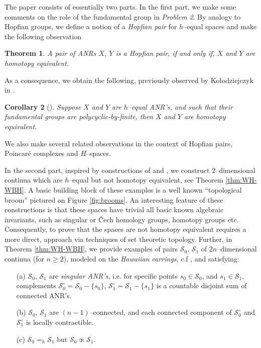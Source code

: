 \documentclass[reqno,12pt]{amsart}
\newtheorem{theorem}{Theorem}
\newtheorem{corollary}[theorem]{Corollary}
\theoremstyle{ourremark}
\numberwithin{equation}{section}
\numberwithin{theorem}{section}
\begin{document}
The paper consists of essentially two parts. In the first part, we make some comments on the role of the fundamental group in {\em Problem 2}. By analogy to Hopfian groups, we define a notion of a {\em Hopfian pair} for $h$--equal spaces and make the following observation
\begin{theorem}\label{thm:hopfian}
A pair of ANRs $X$, $Y$ is a Hopfian pair, if and only if, $X$ and $Y$ are homotopy equivalent.
\end{theorem}
{\noindent} As a consequence, we obtain the following, previously observed by Ko{\l}odziejczyk in \cite{Kolodziejczyk05}. 
\begin{corollary}[\cite{Kolodziejczyk05}]\label{cor:polycyclic}
 Suppose $X$ and $Y$  are $h$--equal ANR's, and such that their fundamental groups are polycyclic-by-finite, then $X$ and $Y$ are  homotopy equivalent.
\end{corollary}
We also make several related observations in the context of Hopfian pairs, Poincar\'e complexes and $H$--spaces.

In the second part, inspired by constructions of \cite{Karimov-Repovs-Rosicki-Zastrow05} and \cite{Stewart58}, we construct  $2$--dimensional continua which are $h$--equal but not homotopy equivalent, see Theorem \ref{thm:WH-WBH}. A basic building block of these examples is a well known ``topological broom'' pictured on Figure \ref{fig:brooms}.
An interesting feature of these constructions is that these spaces have trivial all basic known algebraic invariants, such as singular or \v{C}ech homology groups, homotopy groups etc. Consequently, to prove that the spaces are not homotopy equivalent  requires a more direct, approach via techniques of set theoretic topology. 
Further, in Theorem \ref{thm:WH-WBH},  we provide examples of pairs $\mathcal{S}_0$, $\mathcal{S}_1$ of $2n$--dimensional continua (for $n\geq 2$), modeled on the {\em Hawaiian earrings}, c.f \cite{Eda-Kawamura00},  and  satisfying:    
\begin{itemize}
\item[(a)] $\mathcal{S}_0$, $\mathcal{S}_1$ are {\em singular ANR's}, i.e. for specific points $s_0\in \mathcal{S}_0$, and $s_1\in \mathcal{S}_1$, complements $\mathcal{S}^\circ_0=\mathcal{S}_0-\{s_0\}$, $\mathcal{S}^\circ_1=\mathcal{S}_1-\{s_1\}$ is a countable disjoint sum of connected ANR's.
\item[(b)] $\mathcal{S}_0$, $\mathcal{S}_1$ are $(n-1)$--connected, and each connected component of $\mathcal{S}^\circ_0$ and $\mathcal{S}^\circ_1$ is locally contractible.
\item[(c)] $\mathcal{S}_0=_h\mathcal{S}_1$ but $\mathcal{S}_0\not\simeq\mathcal{S}_1$.
\end{itemize}
\end{document}
